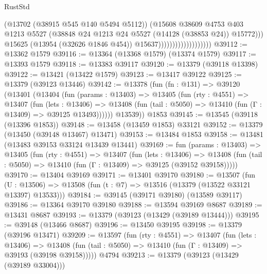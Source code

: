 \begin{lexlean}{RustStd}
\begin{coremodule}
                                            (@13702 (@38915 @545 @140 @5494 @5112))
                                            (@15608
                                              @38609
                                              @4753
                                              @403
                                              @1213
                                              @5527
                                              (@38848
                                                @24
                                                @1213
                                                @24
                                                @5527
                                                (@14128 (@38853 @24))
                                                @15772)))
                                          @15625
                                          (@13954 (@32626 @1846 @454))
                                          @15637)))))))))))))))))))
@39112 := @13362 @1579
@39116 := @13364 (@13368 @1579) (@13374 @1579)
@39117 := @13393 @1579
@39118 := @13383 @39117
@39120 := @13379 (@39118 @13398)
@39122 := @13421 (@13422 @1579)
@39123 := @13417 @39122
@39125 := @13379 (@39123 @13446)
@39142 := @13378
    (fun (fn : @131) =>
    @39120
      (@13401
        (@13404
          (fun (params : @13403) =>
          @13405
            (fun (rty : @4551) =>
            @13407
              (fun (lets : @13406) =>
              @13408 (fun (tail : @5050) => @13410 (fun (Γ : @13409) => @39125 @13493))))))
        @13539))
    @1853
@39145 := @13545 (@39118 (@13396 @1853))
@39148 := @13458 (@13459 @1853) @33121
@39152 := @13379 (@13450 (@39148 @13467) @13471)
@39153 := @13484 @1853
@39158 := @13481 (@13483 @39153 @33124 @13439 @13441)
@39169 := fun (params : @13403) =>
  @13405
    (fun (rty : @4551) =>
    @13407
      (fun (lets : @13406) =>
      @13408 (fun (tail : @5050) => @13410 (fun (Γ : @13409) => @39125 (@39152 @39158)))))
@39170 := @13404 @39169
@39171 := @13401 @39170
@39180 := @13507
    (fun (U : @13506) => @13508 (fun (t : @7) => @13516 (@13379 (@13522 @33121 @13397) @13533)))
@39184 := @39145 (@39171 @39180) (@13589 @39117)
@39186 := @13364 @39170 @39180
@39188 := @13594 @39169 @8687
@39189 := @13431 @8687
@39193 := @13379 (@39123 (@13429 (@39189 @13444)))
@39195 := @39148 (@13466 @8687)
@39196 := @13450 @39195
@39198 := @13379 (@39196 @13471)
@39209 := @13597
    (fun (rty : @4551) =>
    @13407
      (fun (lets : @13406) =>
      @13408 (fun (tail : @5050) => @13410 (fun (Γ : @13409) => @39193 (@39198 @39158)))))
    @4794
@39213 := @13379 (@39123 (@13429 (@39189 @33004)))

\end{coremodule}
\end{lexlean}
